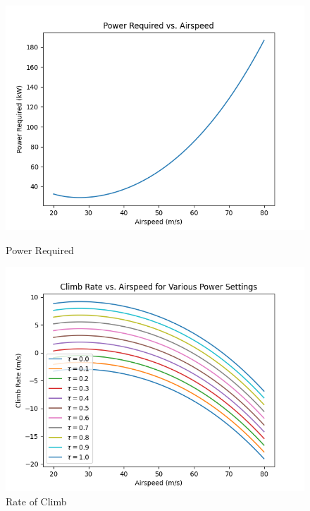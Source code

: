 \documentclass[letterpaper,12pt]{article}
\begin{document}
\begin{figure}[H]
\centering
    \begin{minipage}{0.45\textwidth}
        \centering
        \includegraphics[scale=0.5]{perf_PR} %
        \caption{Power Required}
    \end{minipage}
    \begin{minipage}{0.5\textwidth}
        \centering
        \includegraphics[scale=0.5]{perf_ROC} %
        \caption{Rate of Climb}
    \end{minipage}
\end{figure}
\end{document}
